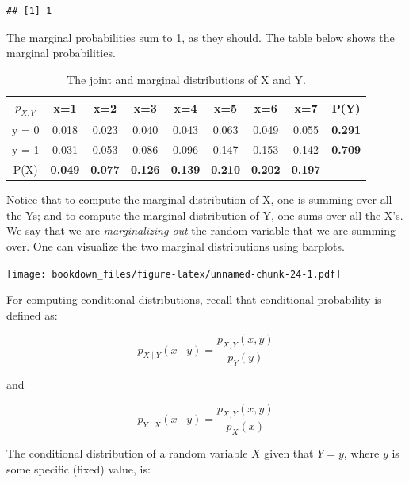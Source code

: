 \documentclass[12pt,]{krantz}
\theoremstyle{definition}
\theoremstyle{definition}
\theoremstyle{definition}
\theoremstyle{remark}
\begin{document}
\begin{verbatim}
## [1] 1
\end{verbatim}

The marginal probabilities sum to 1, as they should. The table below
shows the marginal probabilities.

\small

\begin{table}[!htbp]
\begin{center}
\begin{tabular}{c|ccccccc|c}
$p_{X,Y}$ & x=1 & x=2 & x=3 & x=4 & x=5 & x=6 & x=7 & P(Y)\\
\hline
y = 0 & 0.018 & 0.023 & 0.040 & 0.043 & 0.063 & 0.049 & 0.055 &  \textbf{0.291}\\
y = 1 & 0.031 & 0.053 & 0.086 & 0.096 &  0.147 & 0.153 &  0.142 &  \textbf{0.709}\\
\hline
P(X) & \textbf{0.049} & \textbf{0.077} & \textbf{0.126} & \textbf{0.139} & \textbf{0.210} & \textbf{0.202} & \textbf{0.197}\\
\end{tabular}
\end{center}
\caption{The joint and marginal distributions of X and Y.}\label{discretebivartable2}
\end{table}

\normalsize

Notice that to compute the marginal distribution of X, one is summing
over all the Ys; and to compute the marginal distribution of Y, one sums
over all the X's. We say that we are \emph{marginalizing out} the random
variable that we are summing over. One can visualize the two marginal
distributions using barplots.

\texttt{[image: bookdown\_files/figure-latex/unnamed-chunk-24-1.pdf]}

For computing conditional distributions, recall that conditional
probability is defined as:

\begin{equation}
p_{X\mid Y}(x\mid y) = \frac{p_{X,Y}(x,y)}{p_Y(y)}  
\end{equation}

and

\begin{equation}
p_{Y\mid X}(x\mid y) = \frac{p_{X,Y}(x,y)}{p_X(x)}  
\end{equation}

The conditional distribution of a random variable \(X\) given that
\(Y=y\), where \(y\) is some specific (fixed) value, is:
\end{document}
